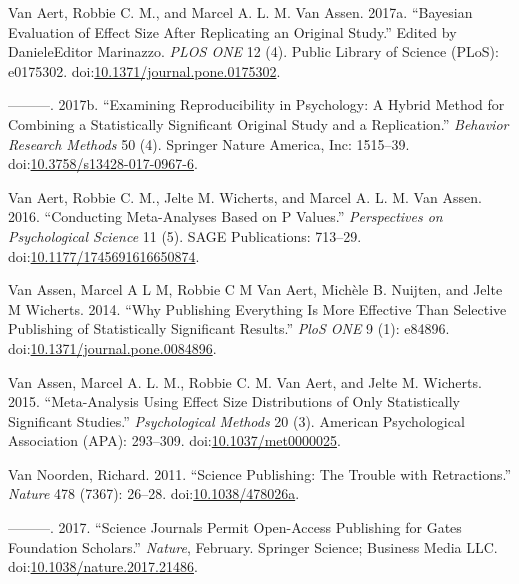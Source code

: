 \documentclass[a5paper]{book}
\begin{document}
\hypertarget{ref-doi:10.1371ux2fjournal.pone.0175302}{}
Van Aert, Robbie C. M., and Marcel A. L. M. Van Assen. 2017a. ``Bayesian
Evaluation of Effect Size After Replicating an Original Study.'' Edited
by DanieleEditor Marinazzo. \emph{PLOS ONE} 12 (4). Public Library of
Science (PLoS): e0175302.
doi:\href{https://doi.org/10.1371/journal.pone.0175302}{10.1371/journal.pone.0175302}.

\hypertarget{ref-doi:10.3758ux2fs13428-017-0967-6}{}
---------. 2017b. ``Examining Reproducibility in Psychology: A Hybrid
Method for Combining a Statistically Significant Original Study and a
Replication.'' \emph{Behavior Research Methods} 50 (4). Springer Nature
America, Inc: 1515--39.
doi:\href{https://doi.org/10.3758/s13428-017-0967-6}{10.3758/s13428-017-0967-6}.

\hypertarget{ref-doi:10.1177ux2f1745691616650874}{}
Van Aert, Robbie C. M., Jelte M. Wicherts, and Marcel A. L. M. Van
Assen. 2016. ``Conducting Meta-Analyses Based on P Values.''
\emph{Perspectives on Psychological Science} 11 (5). SAGE Publications:
713--29.
doi:\href{https://doi.org/10.1177/1745691616650874}{10.1177/1745691616650874}.

\hypertarget{ref-doi:10.1371ux2fjournal.pone.0084896}{}
Van Assen, Marcel A L M, Robbie C M Van Aert, Michèle B. Nuijten, and
Jelte M Wicherts. 2014. ``Why Publishing Everything Is More Effective
Than Selective Publishing of Statistically Significant Results.''
\emph{PloS ONE} 9 (1): e84896.
doi:\href{https://doi.org/10.1371/journal.pone.0084896}{10.1371/journal.pone.0084896}.

\hypertarget{ref-doi:10.1037ux2fmet0000025}{}
Van Assen, Marcel A. L. M., Robbie C. M. Van Aert, and Jelte M.
Wicherts. 2015. ``Meta-Analysis Using Effect Size Distributions of Only
Statistically Significant Studies.'' \emph{Psychological Methods} 20
(3). American Psychological Association (APA): 293--309.
doi:\href{https://doi.org/10.1037/met0000025}{10.1037/met0000025}.

\hypertarget{ref-doi:10.1038ux2f478026a}{}
Van Noorden, Richard. 2011. ``Science Publishing: The Trouble with
Retractions.'' \emph{Nature} 478 (7367): 26--28.
doi:\href{https://doi.org/10.1038/478026a}{10.1038/478026a}.

\hypertarget{ref-doi:10.1038ux2fnature.2017.21486}{}
---------. 2017. ``Science Journals Permit Open-Access Publishing for
Gates Foundation Scholars.'' \emph{Nature}, February. Springer Science;
Business Media LLC.
doi:\href{https://doi.org/10.1038/nature.2017.21486}{10.1038/nature.2017.21486}.
\end{document}
